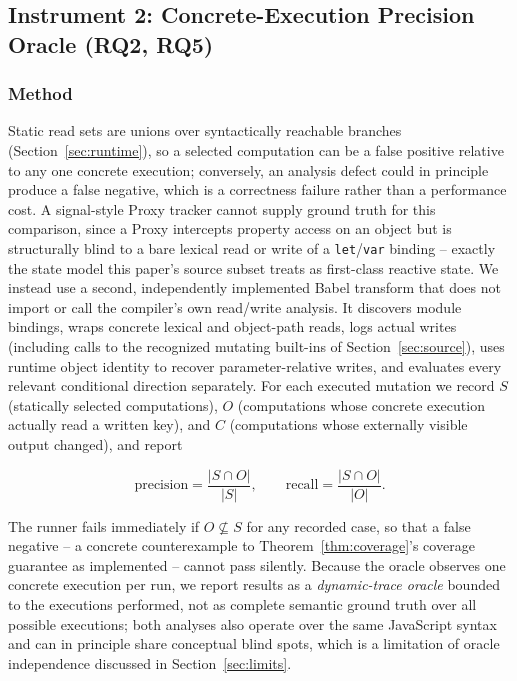 \documentclass[conference]{IEEEtran}
\begin{document}
\subsection{Instrument 2: Concrete-Execution Precision Oracle (RQ2, RQ5)}
\label{sec:oracle}

\subsubsection{Method}
Static read sets are unions over syntactically reachable branches
(Section~\ref{sec:runtime}), so a selected computation can be a false
positive relative to any one concrete execution; conversely, an analysis
defect could in principle produce a false negative, which is a correctness
failure rather than a performance cost. A signal-style Proxy tracker cannot
supply ground truth for this comparison, since a Proxy intercepts property
access on an object but is structurally blind to a bare lexical read or
write of a \texttt{let}/\texttt{var} binding -- exactly the state model this
paper's source subset treats as first-class reactive state. We instead use a
second, independently implemented Babel transform that does not import or
call the compiler's own read/write analysis. It discovers module bindings,
wraps concrete lexical and object-path reads, logs actual writes (including
calls to the recognized mutating built-ins of Section~\ref{sec:source}), uses
runtime object identity to recover parameter-relative writes, and evaluates
every relevant conditional direction separately. For each executed mutation
we record $S$ (statically selected computations), $O$ (computations whose
concrete execution actually read a written key), and $C$ (computations whose
externally visible output changed), and report

\[
\text{precision} = \frac{|S \cap O|}{|S|}, \qquad
\text{recall} = \frac{|S \cap O|}{|O|}.
\]

The runner fails immediately if $O \not\subseteq S$ for any recorded case,
so that a false negative -- a concrete counterexample to
Theorem~\ref{thm:coverage}'s coverage guarantee as implemented -- cannot pass
silently. Because the oracle observes one concrete execution per run, we
report results as a \emph{dynamic-trace oracle} bounded to the executions
performed, not as complete semantic ground truth over all possible
executions; both analyses also operate over the same JavaScript syntax and
can in principle share conceptual blind spots, which is a limitation of
oracle independence discussed in Section~\ref{sec:limits}.
\end{document}

